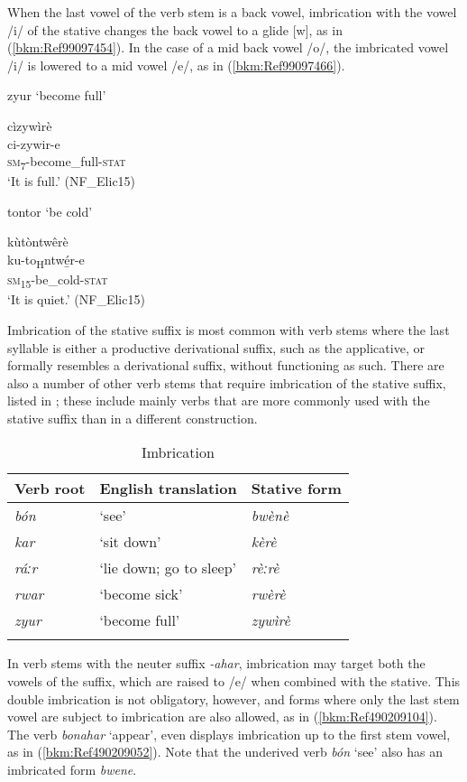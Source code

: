 When the last vowel of the verb stem is a back vowel, imbrication with the vowel /i/ of the stative changes the back vowel to a glide [w], as in (\ref{bkm:Ref99097454}). In the case of a mid back vowel /o/, the imbricated vowel /i/ is lowered to a mid vowel /e/, as in (\ref{bkm:Ref99097466}).

\ea
\label{bkm:Ref99097454}
\ea
zyur ‘become full’

\ex
\glll cìzywìrè\\
ci-zywir-e\\
\textsc{sm}\textsubscript{7}-become\_full-\textsc{stat}\\
\glt ‘It is full.’ (NF\_Elic15)
\z\z

\ea
\label{bkm:Ref99097466}
\ea
tontor ‘be cold’

\ex
\glll kùtòntwêrè\\
ku-to\textsubscript{H}ntwé̲r-e\\
\textsc{sm}\textsubscript{15}-be\_cold-\textsc{stat}\\
\glt ‘It is quiet.’ (NF\_Elic15)
\z\z

Imbrication of the stative suffix is most common with verb stems where the last syllable is either a productive derivational suffix, such as the applicative, or formally resembles a derivational suffix, without functioning as such. There are also a number of other verb stems that require imbrication of the stative suffix, listed in ; these include mainly verbs that are more commonly used with the stative suffix than in a different construction.

\begin{table}
\label{bkm:Ref99097503}\caption{\label{tab:9:3}Imbrication}

\begin{tabular}{lll}
\lsptoprule
Verb root & English translation & Stative form\\
\midrule
\textit{bón} & ‘see’ & \textit{bwènè}\\
\textit{kar} & ‘sit down’ & \textit{kèrè}\\
\textit{ráːr} & ‘lie down; go to sleep’ & \textit{rèːrè}\\
\textit{rwar} & ‘become sick’ & \textit{rwèrè}\\
\textit{zyur} & ‘become full’ & \textit{zywìrè}\\
\lspbottomrule
\end{tabular}
\end{table}

In verb stems with the neuter suffix \textit{-ahar}, imbrication may target both the vowels of the suffix, which are raised to /e/ when combined with the stative. This double imbrication is not obligatory, however, and forms where only the last stem vowel are subject to imbrication are also allowed, as in (\ref{bkm:Ref490209104}). The verb \textit{bonahar} ‘appear’, even displays imbrication up to the first stem vowel, as in (\ref{bkm:Ref490209052}). Note that the underived verb \textit{bón} ‘see’ also has an imbricated form \textit{bwene}.\largerpage

